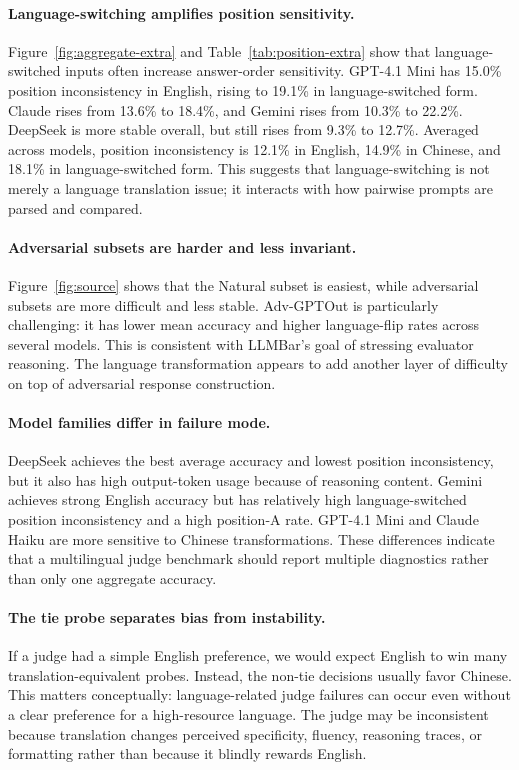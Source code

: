 \documentclass[10pt,twocolumn]{article}
\begin{document}
\paragraph{Language-switching amplifies position sensitivity.}
Figure~\ref{fig:aggregate-extra} and Table~\ref{tab:position-extra} show that language-switched inputs often increase answer-order sensitivity. GPT-4.1 Mini has 15.0\% position inconsistency in English, rising to 19.1\% in language-switched form. Claude rises from 13.6\% to 18.4\%, and Gemini rises from 10.3\% to 22.2\%. DeepSeek is more stable overall, but still rises from 9.3\% to 12.7\%. Averaged across models, position inconsistency is 12.1\% in English, 14.9\% in Chinese, and 18.1\% in language-switched form. This suggests that language-switching is not merely a language translation issue; it interacts with how pairwise prompts are parsed and compared.

\paragraph{Adversarial subsets are harder and less invariant.}
Figure~\ref{fig:source} shows that the Natural subset is easiest, while adversarial subsets are more difficult and less stable. Adv-GPTOut is particularly challenging: it has lower mean accuracy and higher language-flip rates across several models. This is consistent with LLMBar's goal of stressing evaluator reasoning. The language transformation appears to add another layer of difficulty on top of adversarial response construction.

\paragraph{Model families differ in failure mode.}
DeepSeek achieves the best average accuracy and lowest position inconsistency, but it also has high output-token usage because of reasoning content. Gemini achieves strong English accuracy but has relatively high language-switched position inconsistency and a high position-A rate. GPT-4.1 Mini and Claude Haiku are more sensitive to Chinese transformations. These differences indicate that a multilingual judge benchmark should report multiple diagnostics rather than only one aggregate accuracy.

\paragraph{The tie probe separates bias from instability.}
If a judge had a simple English preference, we would expect English to win many translation-equivalent probes. Instead, the non-tie decisions usually favor Chinese. This matters conceptually: language-related judge failures can occur even without a clear preference for a high-resource language. The judge may be inconsistent because translation changes perceived specificity, fluency, reasoning traces, or formatting rather than because it blindly rewards English.
\end{document}
